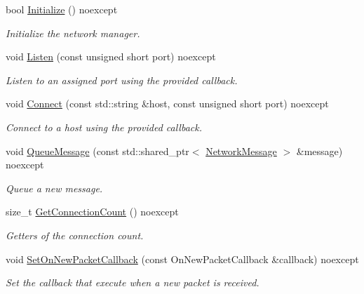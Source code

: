 \begin{DoxyCompactItemize}
\item 
\mbox{\label{class_blade_1_1_network_manager_a9b1c863473df3dddfd4347c4fa570a80}} 
bool \hyperlink{class_blade_1_1_network_manager_a9b1c863473df3dddfd4347c4fa570a80}{Initialize} () noexcept
\begin{DoxyCompactList}\small\item\em Initialize the network manager. \end{DoxyCompactList}\item 
void \hyperlink{class_blade_1_1_network_manager_a1e097a251026499832bd7238adb48d8a}{Listen} (const unsigned short port) noexcept
\begin{DoxyCompactList}\small\item\em Listen to an assigned port using the provided callback. \end{DoxyCompactList}\item 
void \hyperlink{class_blade_1_1_network_manager_a61a872d6eec9050280dc041a7cda3759}{Connect} (const std\+::string \&host, const unsigned short port) noexcept
\begin{DoxyCompactList}\small\item\em Connect to a host using the provided callback. \end{DoxyCompactList}\item 
void \hyperlink{class_blade_1_1_network_manager_a3127ee70f644dedfa8be9372805f6d5a}{Queue\+Message} (const std\+::shared\+\_\+ptr$<$ \hyperlink{class_blade_1_1_network_message}{Network\+Message} $>$ \&message) noexcept
\begin{DoxyCompactList}\small\item\em Queue a new message. \end{DoxyCompactList}\item 
size\+\_\+t \hyperlink{class_blade_1_1_network_manager_ac8dcbba66d285f6a14ad1bcfa346ae5e}{Get\+Connection\+Count} () noexcept
\begin{DoxyCompactList}\small\item\em Getters of the connection count. \end{DoxyCompactList}\item 
void \hyperlink{class_blade_1_1_network_manager_a12f5afdfc075b71ea82d4d657a78d780}{Set\+On\+New\+Packet\+Callback} (const On\+New\+Packet\+Callback \&callback) noexcept
\begin{DoxyCompactList}\small\item\em Set the callback that execute when a new packet is received. \end{DoxyCompactList}\item 

\end{DoxyCompactItemize}
